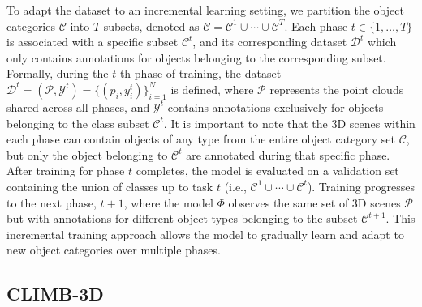 To adapt the dataset to an incremental learning setting, we partition the object categories $\mathcal{C}$ into $T$ subsets, denoted as $\mathcal{C} = \mathcal{C}^1 \cup \cdots \cup \mathcal{C}^T$. 
Each phase $t  \in \{1, \dots, T\}$ is associated with a specific subset $\mathcal{C}^t$, and its corresponding dataset $\mathcal{D}^t$ which only contains annotations for objects belonging to the corresponding subset.
Formally, during the $t$-th phase of training, the dataset $\mathcal{D}^t = (\mathcal{P}, \mathcal{Y}^t) = \{(p_i, y_i^t)\}_{i=1}^N$ is defined, where $\mathcal{P}$ represents the point clouds shared across all phases, and $\mathcal{Y}^t$ contains annotations exclusively for objects belonging to the class subset $\mathcal{C}^t$. It is important to note that the 3D scenes within each phase can contain objects of any type from the entire object category set $\mathcal{C}$, but only the object belonging to $\mathcal{C}^t$ are annotated during that specific phase. After training for phase $t$ completes, the model is evaluated on a validation set containing the union of classes up to task $t$ (i.e., $\mathcal{C}^1 \cup \cdots \cup \mathcal{C}^t$). Training progresses to the next phase, $t+1$, where the model $\Phi$ observes the same set of 3D scenes $\mathcal{P}$ but with annotations for different object types belonging to the subset $\mathcal{C}^{t+1}$. This incremental training approach allows the model to gradually learn and adapt to new object categories over multiple phases.

\subsection{CLIMB-3D}
\label{sec:climb3d}

